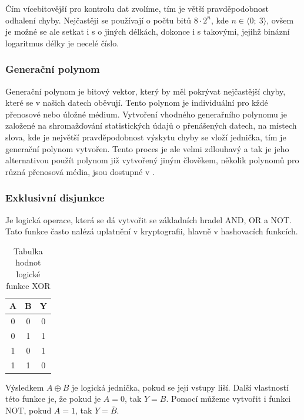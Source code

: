 Čím vícebitovější  pro kontrolu dat zvolíme, tím je větší pravděpodobnost odhalení chyby. Nejčastěji se používají  o počtu bitů $8 \cdot 2^n$, kde $n \in \langle 0;~3\rangle$, ovšem je možné se ale setkat i s  o jiných délkách, dokonce i s takovými, jejihž binázní logaritmus délky je necelé číslo.

\subsubsection{Generační polynom}
Generační polynom je bitový vektor, který by měl pokrývat nejčastější chyby, které se v našich datech oběvují. Tento polynom je individuální pro kždé přenosové nebo úložné médium. Vytvoření vhodného generařního polynomu je založené na shromažďování statistických údajů o přenášených datech, na místech slova, kde je největší pravděpodobnost výskytu chyby se vloží jednička, tím je generační polynom vytvořen. Tento proces je ale velmi zdlouhavý a tak je jeho alternativou použít polynom již vytvořený jiným člověkem, několik polynomů pro různá přenosová média, jsou dostupné v \cite{crc-wiki}.

\subsubsection{Exklusivní disjunkce}
Je logická operace, která se dá vytvořit se základních hradel AND, OR a NOT. Tato funkce často nalézá uplatnění v kryptografii, hlavně v hashovacích funkcích.

\begin{table}[!h]
  \caption{Tabulka hodnot logické funkce XOR}
  \begin{center}
  	\small
	  \begin{tabular}{|c|c||c|}
	    \hline
	    A & B & Y \\
	    \hline\hline
	    0 & 0 & 0 \\
	    \hline
	    0 & 1 & 1 \\
	    \hline
	    1 & 0 & 1 \\
	    \hline
	    1 & 1 & 0 \\
	    \hline
	  \end{tabular}
  \end{center}
\end{table}

 Výsledkem  $A \oplus B $ je logická jednička, pokud se její vstupy liší. Další vlastností této funkce je, že pokud je $A = 0$, tak $Y = B$. Pomocí  můžeme vytvořit i funkci NOT, pokud $A = 1$, tak $Y = \overline{B}$.

